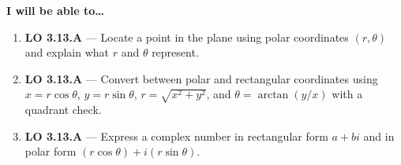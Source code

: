 \documentclass[10pt]{article}
\begin{document}
\namedateperiod

\vspace{0.10in}

\begin{objectivebox}
\textbf{I will be able to\ldots}
\begin{enumerate}[leftmargin=1.5em, itemsep=4pt]
  \item \textbf{LO 3.13.A} --- Locate a point in the plane using polar
    coordinates $(r,\theta)$ and explain what $r$ and $\theta$ represent.
  \item \textbf{LO 3.13.A} --- Convert between polar and rectangular
    coordinates using $x = r\cos\theta$, $y = r\sin\theta$, $r = \sqrt{x^2+y^2}$,
    and $\theta = \arctan(y/x)$ with a quadrant check.
  \item \textbf{LO 3.13.A} --- Express a complex number in rectangular form
    $a+bi$ and in polar form $(r\cos\theta)+i(r\sin\theta)$.
\end{enumerate}
\end{objectivebox}

\vspace{0.08in}
\end{document}
